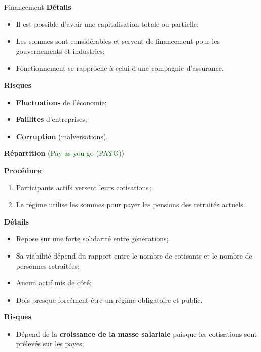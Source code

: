 \documentclass[10pt, french]{article}
\begin{document}
\begin{multicols*}{3}
\begin{conceptgen}{Financement}
\textbf{Détails}
\begin{itemize}[leftmargin = *]
	\item	Il est possible d'avoir une capitalisation totale ou partielle;
	\item	Les sommes sont considérables et servent de financement pour les gouvernements et industries;
	\item	Fonctionnement se rapproche à celui d'une compagnie d'assurance.
\end{itemize}

\textbf{Risques}
\begin{itemize}[leftmargin = *]
	\item	\textbf{Fluctuations} de l'économie;
	\item	\textbf{Faillites} d'entreprises;
	\item	\textbf{Corruption} (malversations).
\end{itemize}

\tcbline

\begin{center}
\textbf{Répartition} (\textcolor{darkgreen}{Pay-as-you-go (PAYG)})
\end{center}

\textbf{Procédure}:
\begin{enumerate}[leftmargin = *]
	\item	Participants actifs versent leurs cotisations;
	\item	Le régime utilise les sommes pour payer les pensions des retraités actuels.
\end{enumerate}

\textbf{Détails}
\begin{itemize}[leftmargin = *]
	\item	Repose sur une forte solidarité entre générations;
	\item	Sa viabilité dépend du rapport entre le nombre de cotisants et le nombre de personnes retraitées;
	\item	Aucun actif mis de côté;
	\item	Dois presque forcément être un régime obligatoire et public.
\end{itemize}

\textbf{Risques}
\begin{itemize}[leftmargin = *]
	\item	Dépend de la \textbf{croissance de la masse salariale} puisque les cotisations sont prélevés sur les payes;
\end{itemize}
\end{conceptgen}


\end{multicols*}
\end{document}
